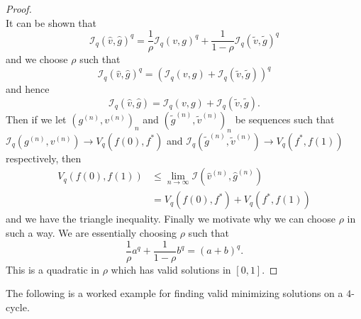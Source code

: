 \documentclass[conference]{IEEEtran}
\theoremstyle{ieeestyle}
\begin{document}
\begin{proof}
\begin{equation*}
    \end{equation*}
    It can be shown that 
    \begin{equation*}
        \mathcal{I}_q(\hat{v},\hat{g})^q = \frac{1}{\rho}\mathcal{I}_q(v,g)^q + \frac{1}{1 - \rho}\mathcal{I}_q(\tilde{v},\tilde{g})^q
    \end{equation*}
    and we choose $\rho$ such that 
    \begin{equation*}
        \mathcal{I}_q(\hat{v},\hat{g})^q = \left(\mathcal{I}_q(v,g) + \mathcal{I}_q(\tilde{v},\tilde{g}) \right)^q
    \end{equation*}
    and hence 
    \begin{equation*}
         \mathcal{I}_q(\hat{v},\hat{g}) = \mathcal{I}_q(v,g) + \mathcal{I}_q(\tilde{v},\tilde{g}).
    \end{equation*}
    Then if we let $(g^{(n)},v^{(n)})_n$ and $(\tilde{g}^{(n)},\tilde{v}^{(n)})_n$ be sequences such that $\mathcal{I}_q(g^{(n)},v^{(n)}) \rightarrow V_q(f(0),f^*)$ and $\mathcal{I}_q(\tilde{g}^{(n)},\tilde{v}^{(n)}) \rightarrow V_q(f^*,f(1))$ respectively, then 
    \begin{align*}
        V_q(f(0),f(1)) &\leq \lim_{n \rightarrow \infty} \mathcal{I}(\hat{v}^{(n)},\hat{g}^{(n)}) \\
        &= V_q(f(0),f^*) + V_q(f^*,f(1))
    \end{align*}
    and we have the triangle inequality. Finally we motivate why we can choose $\rho$ in such a way. We are essentially choosing $\rho$ such that 
    \begin{equation*}
        \frac{1}{\rho}a^q + \frac{1}{1-\rho}b^q = (a+b)^q.
    \end{equation*}
    This is a quadratic in $\rho$ which has valid solutions in $[0,1]$.
\end{proof}
The following is a worked example for finding valid minimizing solutions on a $4$-cycle.
\end{document}
